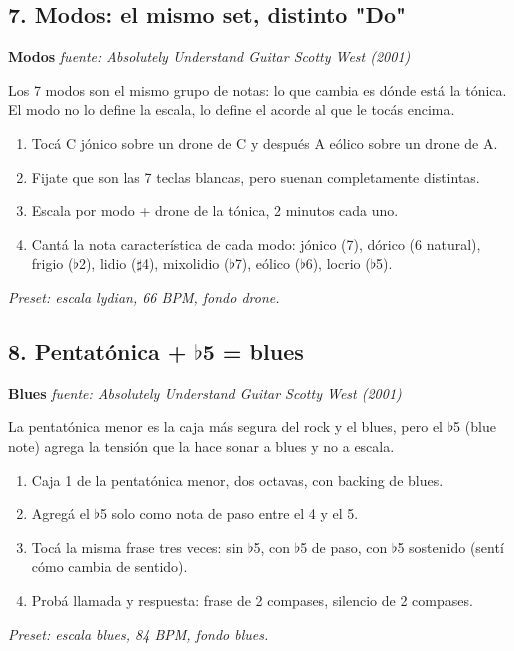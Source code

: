 \documentclass[11pt,a4paper]{article}
\begin{document}
\subsection{7. Modos: el mismo set, distinto "Do"}
\textbf{Modos} \hfill \emph{fuente: Absolutely Understand Guitar \textemdash{} Scotty West (2001)}
\par Los 7 modos son el mismo grupo de notas: lo que cambia es dónde está la tónica. El modo no lo define la escala, lo define el acorde al que le tocás encima.
\begin{enumerate}
\item Tocá C jónico sobre un drone de C y después A eólico sobre un drone de A.
\item Fijate que son las 7 teclas blancas, pero suenan completamente distintas.
\item Escala por modo + drone de la tónica, 2 minutos cada uno.
\item Cantá la nota característica de cada modo: jónico (7), dórico (6 natural), frigio (\ensuremath{\flat}2), lidio (\ensuremath{\sharp}4), mixolidio (\ensuremath{\flat}7), eólico (\ensuremath{\flat}6), locrio (\ensuremath{\flat}5).
\end{enumerate}
\emph{Preset: escala lydian, 66 BPM, fondo drone.}
\subsection{8. Pentatónica + \ensuremath{\flat}5 = blues}
\textbf{Blues} \hfill \emph{fuente: Absolutely Understand Guitar \textemdash{} Scotty West (2001)}
\par La pentatónica menor es la caja más segura del rock y el blues, pero el \ensuremath{\flat}5 (blue note) agrega la tensión que la hace sonar a blues y no a escala.
\begin{enumerate}
\item Caja 1 de la pentatónica menor, dos octavas, con backing de blues.
\item Agregá el \ensuremath{\flat}5 solo como nota de paso entre el 4 y el 5.
\item Tocá la misma frase tres veces: sin \ensuremath{\flat}5, con \ensuremath{\flat}5 de paso, con \ensuremath{\flat}5 sostenido (sentí cómo cambia de sentido).
\item Probá llamada y respuesta: frase de 2 compases, silencio de 2 compases.
\end{enumerate}
\emph{Preset: escala blues, 84 BPM, fondo blues.}
\end{document}
